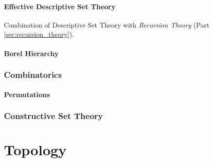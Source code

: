 \documentclass{article}
\begin{document}
\subsection{Effective Descriptive Set Theory}

Combination of Descriptive Set Theory with \emph{Recursion Theory}
(Part \ref{sec:recursion_theory}).

\subsection{Borel Hierarchy}\label{subsec:borel_hierarchy}



\section{Combinatorics}

\subsection{Permutations}\label{subsec:permutations}



\section{Constructive Set Theory}\label{sec:constructive_set_theory}



\part{Topology}\label{sec:topology}\cite{lc11}
\end{document}
